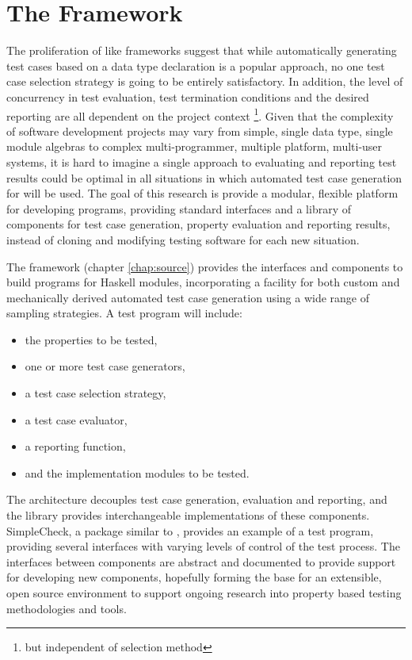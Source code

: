 \section{The \GC Framework}

The proliferation of \QC like \pbt frameworks
suggest that while automatically generating test cases
based on a data type declaration is a popular approach,
no one test case selection strategy is going to be entirely satisfactory.
In addition,
the level of concurrency in test evaluation,
test termination conditions and the desired reporting
are all dependent on the project context
\footnote{but independent of selection method}.
Given that the complexity of software development projects
may vary from simple, single data type, single module algebras to
complex multi-programmer, multiple platform, multi-user systems,
it is hard to imagine a single approach to evaluating and reporting test results
could be optimal in all situations in which
automated test case generation for \pbt will be used.
The goal of this research is provide  a modular, flexible platform for developing \pbt programs,
providing standard interfaces and a library of components for 
test case generation, property evaluation and reporting results,
instead of cloning and modifying testing software for each new situation.

The \GC framework (chapter \ref{chap:source}) provides
the interfaces and components to build \pbt programs for Haskell modules,
incorporating a facility for both custom and mechanically derived 
automated test case generation using a wide range of sampling strategies.
A \GC test program will include:

\begin{itemize}
\item the properties to be tested,
\item one or more test case generators,
\item a test case selection strategy,
\item a test case evaluator,
\item a reporting function,
\item and the implementation modules to be tested.
\end{itemize}

\noindent The architecture decouples test case generation, 
evaluation and reporting,
and the library provides interchangeable implementations of these components.
SimpleCheck, a package similar to \QC, 
provides an example of a \GC test program,
providing several interfaces with varying  levels of control of the test process.
The interfaces between components are abstract and documented to provide 
support for developing new components,
hopefully forming the base for an extensible, open source environment to 
support ongoing research into property based testing methodologies and tools.

